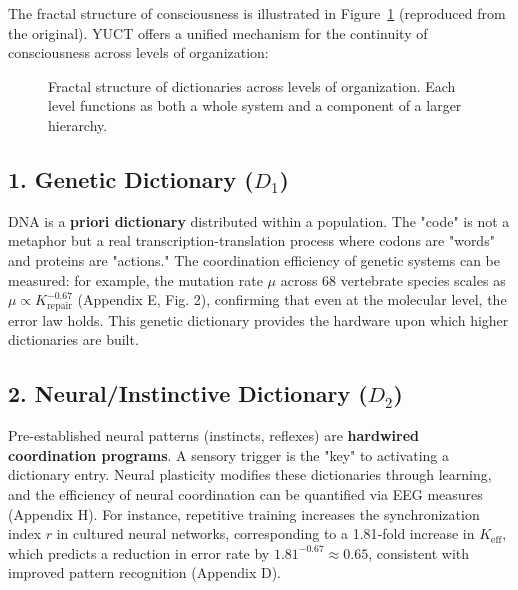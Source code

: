 \documentclass[12pt,a4paper]{article}
\newcommand{\eff}{\mathrm{eff}}
\newcommand{\Ke}{K_{\eff}}
\begin{document}
	The fractal structure of consciousness is illustrated in Figure~\ref{fig:fractal_dict} (reproduced from the original). YUCT offers a unified mechanism for the continuity of consciousness across levels of organization:
	
	\begin{figure}[htbp]
		\centering
		\caption{Fractal structure of dictionaries across levels of organization. Each level functions as both a whole system and a component of a larger hierarchy.}
		\label{fig:fractal_dict}
	\end{figure}
	
	\subsection{1. Genetic Dictionary ($D_1$)}
	
	DNA is a \textbf{priori dictionary} distributed within a population. The "code" is not a metaphor but a real transcription-translation process where codons are "words" and proteins are "actions." The coordination efficiency of genetic systems can be measured: for example, the mutation rate $\mu$ across 68 vertebrate species scales as $\mu \propto K_{\text{repair}}^{-0.67}$ (Appendix E, Fig. 2), confirming that even at the molecular level, the error law holds. This genetic dictionary provides the hardware upon which higher dictionaries are built.
	
	\subsection{2. Neural/Instinctive Dictionary ($D_2$)}
	
	Pre-established neural patterns (instincts, reflexes) are \textbf{hardwired coordination programs}. A sensory trigger is the "key" to activating a dictionary entry. Neural plasticity modifies these dictionaries through learning, and the efficiency of neural coordination can be quantified via EEG measures (Appendix H). For instance, repetitive training increases the synchronization index $r$ in cultured neural networks, corresponding to a 1.81‑fold increase in $\Ke$, which predicts a reduction in error rate by $1.81^{-0.67} \approx 0.65$, consistent with improved pattern recognition (Appendix D).
	
\end{document}
